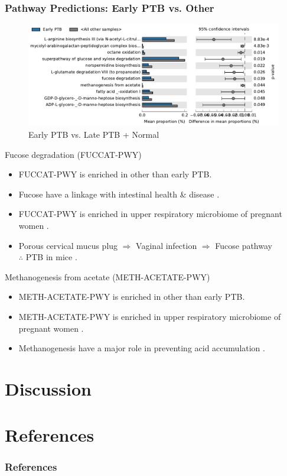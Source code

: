 \documentclass{beamer}
\begin{document}
    \begin{frame}[allowframebreaks]
        \frametitle{Pathway Predictions: Early PTB vs. Other}

        \begin{figure}
            \includegraphics[width=0.9 \linewidth]{figures/PICRUSt2/Early.pdf}
            \caption{Early PTB vs. Late PTB + Normal}
        \end{figure}

        \begin{block}{Fucose degradation (FUCCAT-PWY)}
            \begin{itemize}
                \item FUCCAT-PWY is enriched in other than early PTB.
                \item Fucose have a linkage with intestinal health \& disease \cite{FUCCAT-PWY-2}.
                \item FUCCAT-PWY is enriched in upper respiratory microbiome of pregnant women \cite{FUCCAT-PWY-1}.
                \item Porous cervical mucus plug $\Rightarrow$ Vaginal infection $\Rightarrow$ Fucose pathway \\
                    $\therefore$ PTB in mice \cite{FUCCAT-PWY-3}.
            \end{itemize}
        \end{block}

        \begin{block}{Methanogenesis from acetate (METH-ACETATE-PWY)}
            \begin{itemize}
                \item METH-ACETATE-PWY is enriched in other than early PTB.
                \item METH-ACETATE-PWY is enriched in upper respiratory microbiome of pregnant women \cite{FUCCAT-PWY-1}.
                \item Methanogenesis have a major role in preventing acid accumulation \cite{METH-ACETATE-PWY-1}.
            \end{itemize}
        \end{block}
    \end{frame}

    \section{Discussion}

    \section{References}
   	\begin{frame}[allowframebreaks]
        \frametitle{References}
        
        
    \end{frame}
\end{document}
